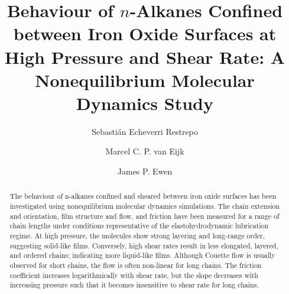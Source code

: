 \documentclass[5p]{elsarticle}
\begin{document}

\title{Behaviour of $n$-Alkanes Confined between Iron Oxide Surfaces at High Pressure and Shear Rate: A Nonequilibrium Molecular Dynamics Study}


\author[SKF,KCL]{Sebasti\'{a}n Echeverri Restrepo}
\author[SKF]{Marcel C. P. van Eijk}
\author[IC,CA]{James P. Ewen}
\address[SKF]{SKF Research \& Technology Development, Nieuwegein, The Netherlands}
\address[KCL]{Department of Physics, King's College London, Strand, London WC2R 2LS, UK}
\address[IC]{Department of Mechanical Engineering, Imperial College London, London SW7 2AZ, England, UK}
\address[CA]{Corresponding author}


\begin{abstract}
The behaviour of n-alkanes confined and sheared between iron oxide surfaces has been investigated using nonequilibrium molecular dynamics simulations. The chain extension and orientation, film structure and flow, and friction have been measured for a range of chain lengths under conditions representative of the elastohydrodynamic lubrication regime. At high pressure, the molecules show strong layering and long-range order, suggesting solid-like films. Conversely, high shear rates result in less elongated, layered, and ordered chains; indicating more liquid-like films. Although Couette flow is usually observed for short chains, the flow is often non-linear for long chains. The friction coefficient increases logarithmically with shear rate, but the slope decreases with increasing pressure such that it becomes insensitive to shear rate for long chains.

\end{abstract}
\end{document}
